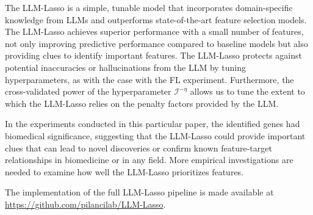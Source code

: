 The LLM-Lasso is a simple, tunable model that incorporates domain-specific knowledge from LLMs and outperforms state-of-the-art feature selection models. The LLM-Lasso achieves superior performance with a small number of features, not only improving predictive performance compared to baseline models but also providing clues to identify important features. The LLM-Lasso protects against potential inaccuracies or hallucinations from the LLM by tuning hyperparameters, as with the case with the FL experiment. Furthermore, the cross-validated power of the hyperparameter $\mathcal{I}^{-\eta}$ allows us to tune the extent to which the LLM-Lasso relies on the penalty factors provided by the LLM.

In the experiments conducted in this particular paper, the identified genes had biomedical significance, suggesting that the LLM-Lasso could provide important clues that can lead to novel discoveries or confirm known feature-target relationships in biomedicine or in any field. More empirical investigations are needed to examine how well the LLM-Lasso prioritizes features.  

The implementation of the full LLM-Lasso pipeline is made available at \href{https://github.com/pilancilab/LLM-Lasso}{https://github.com/pilancilab/LLM-Lasso}.
